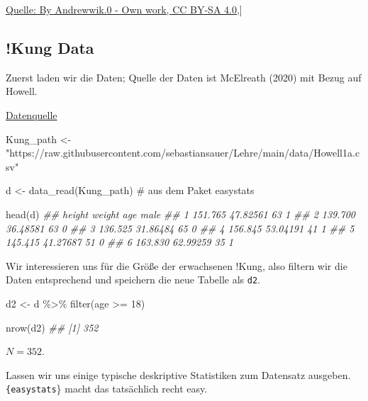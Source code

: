 \documentclass[
  a4paper,
  DIV=11]{scrreprt}
\newenvironment{Shaded}{\begin{snugshade}}{\end{snugshade}}
\newcommand{\CommentTok}[1]{\textcolor[rgb]{0.37,0.37,0.37}{#1}}
\newcommand{\DecValTok}[1]{\textcolor[rgb]{0.68,0.00,0.00}{#1}}
\newcommand{\DocumentationTok}[1]{\textcolor[rgb]{0.37,0.37,0.37}{\textit{#1}}}
\newcommand{\FunctionTok}[1]{\textcolor[rgb]{0.28,0.35,0.67}{#1}}
\newcommand{\NormalTok}[1]{\textcolor[rgb]{0.00,0.23,0.31}{#1}}
\newcommand{\OtherTok}[1]{\textcolor[rgb]{0.00,0.23,0.31}{#1}}
\newcommand{\SpecialCharTok}[1]{\textcolor[rgb]{0.37,0.37,0.37}{#1}}
\newcommand{\StringTok}[1]{\textcolor[rgb]{0.13,0.47,0.30}{#1}}
\theoremstyle{definition}
\theoremstyle{remark}
\begin{document}
\href{https://commons.wikimedia.org/w/index.php?curid=79801340}{Quelle:
By Andrewwik.0 - Own work, CC BY-SA 4.0,}{]}

\hypertarget{kung-data}{%
\subsection{!Kung Data}\label{kung-data}}

Zuerst laden wir die Daten; Quelle der Daten ist McElreath (2020) mit
Bezug auf Howell.

\href{https://raw.githubusercontent.com/sebastiansauer/2021-wise/main/Data/Howell1a.csv}{Datenquelle}

\begin{Shaded}
\begin{Highlighting}[]
\NormalTok{Kung\_path }\OtherTok{\textless{}{-}}  
  \StringTok{"https://raw.githubusercontent.com/sebastiansauer/Lehre/main/data/Howell1a.csv"}  

\NormalTok{d }\OtherTok{\textless{}{-}} \FunctionTok{data\_read}\NormalTok{(Kung\_path)  }\CommentTok{\# aus dem Paket \textasciigrave{}easystats\textasciigrave{}}

\FunctionTok{head}\NormalTok{(d)}
\DocumentationTok{\#\#    height   weight age male}
\DocumentationTok{\#\# 1 151.765 47.82561  63    1}
\DocumentationTok{\#\# 2 139.700 36.48581  63    0}
\DocumentationTok{\#\# 3 136.525 31.86484  65    0}
\DocumentationTok{\#\# 4 156.845 53.04191  41    1}
\DocumentationTok{\#\# 5 145.415 41.27687  51    0}
\DocumentationTok{\#\# 6 163.830 62.99259  35    1}
\end{Highlighting}
\end{Shaded}

Wir interessieren uns für die Größe der erwachsenen !Kung, also filtern
wir die Daten entsprechend und speichern die neue Tabelle als
\texttt{d2}.

\begin{Shaded}
\begin{Highlighting}[]
\NormalTok{d2 }\OtherTok{\textless{}{-}}\NormalTok{ d }\SpecialCharTok{\%\textgreater{}\%} 
  \FunctionTok{filter}\NormalTok{(age }\SpecialCharTok{\textgreater{}=} \DecValTok{18}\NormalTok{)}

\FunctionTok{nrow}\NormalTok{(d2)}
\DocumentationTok{\#\# [1] 352}
\end{Highlighting}
\end{Shaded}

\(N=352\).

Lassen wir uns einige typische deskriptive Statistiken zum Datensatz
ausgeben. \texttt{\{easystats}\} macht das tatsächlich recht easy.
\end{document}
